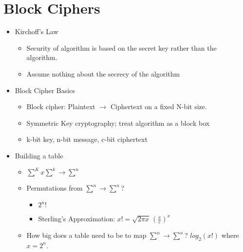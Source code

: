 \section{Block Ciphers}
\begin{itemize}
\item Kirchoff's Law
    \begin{itemize}
    \item Security of algorithm is based on the secret key rather than the algorithm.
    \item Assume nothing about the secrecy of the algorithm
    \end{itemize}
\item Block Cipher Basics
    \begin{itemize}
    \item Block cipher: Plaintext $\rightarrow$ Ciphertext on a fixed N-bit size. 
    \item Symmetric Key cryptography; treat algorithm as a block box
    \item k-bit key, n-bit message, c-bit ciphertext
    \end{itemize}
\item Building a table
    \begin{itemize}
    \item $\sum^K x \sum^k \rightarrow \sum^n$
    \item Permutations from $\sum^n \rightarrow \sum^n$?
        \begin{itemize}
        \item $2^n!$
        \item Sterling's Approximation: $x! = \sqrt{2\pi x}\,(\frac{x}{e})^x $
        \end{itemize}
    \item How big does a table need to be to map $\sum^n \rightarrow \sum^n$? $log_2(x!)$ where $x = 2^n$.
    \end{itemize}
\end{itemize}